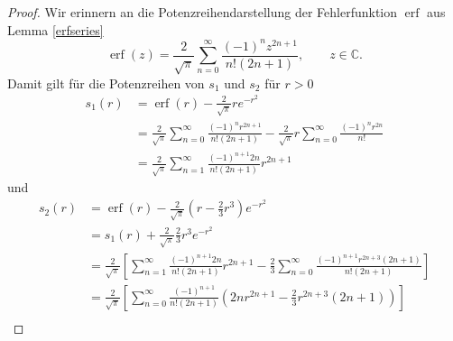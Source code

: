 \documentclass[12pt,a4paper]{scrartcl}
\numberwithin{equation}{section}
\newcommand{\C}{\mathbb{C}} %
\newcommand{\erf}{\operatorname{erf}}
\begin{document}
\begin{proof}
Wir erinnern an die Potenzreihendarstellung der Fehlerfunktion $\erf$ aus \\ Lemma \ref{erfseries}
\[
\erf(z) = \frac{2}{\sqrt{\pi}}\sum_{n=0}^\infty \frac{(-1)^n z^{2 n +1}}{n!(2 n +1 )}, \qquad z\in\C.
\]
Damit gilt für die Potenzreihen von $s_1$ und $s_2$ für $r>0$ 
\begin{align*}
s_1(r) &= \erf(r) -\frac{2}{\sqrt{\pi}}r e^{-r^2} \\
  &= \frac{2}{\sqrt{\pi}}\sum_{n=0}^\infty \frac{(-1)^n r^{2 n +1}}{n!(2 n +1 )} - \frac{2}{\sqrt{\pi}}r \sum_{n=0}^\infty \frac{(-1)^n r^{2n}}{n!} \\
  &=\frac{2}{\sqrt{\pi}}\sum_{n=1}^\infty \frac{(-1)^{n+1}2n}{n!(2n +1)} r^{2 n +1}
\end{align*}
und 
\begin{align*}
s_2(r) 
&= \erf(r) -\frac{2}{\sqrt{\pi}}\left(r- \frac{2}{3}r^3\right) e^{-r^2} \\
&= s_1(r) + \frac{2}{\sqrt{\pi}}\frac{2}{3}r^3 e^{-r^2} \\
&= \frac{2}{\sqrt{\pi}}\left[\sum_{n=1}^\infty \frac{(-1)^{n+1}2n}{n!(2n +1)} r^{2 n +1} - \frac{2}{3} \sum_{n=0}^\infty \frac{(-1)^{n+1} r^{2n+3}(2n+1)}{n!(2n+1)} \right] \\
&= \frac{2}{\sqrt{\pi}}\left[\sum_{n=0}^\infty \frac{(-1)^{n+1}}{n!(2n +1)} \left( 2n r^{2 n +1} - \frac{2}{3} r^{2n+3}(2n+1)\right) \right] \\
\end{align*}

\end{proof}
\end{document}
